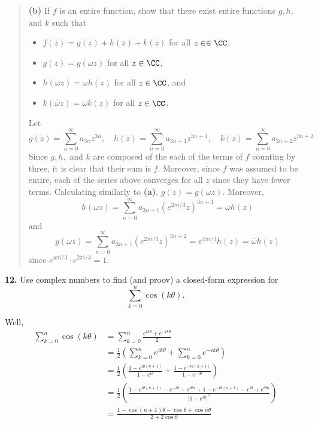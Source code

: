 \documentclass{homework}
\begin{document}
\begin{quote}
  {\bf (b)} If $f$ is an entire function, show that there exist entire functions $g,h$, and $k$ such that
  \begin{itemize}
    \item $f(z) = g(z) + h(z) + k(z)$ for all $z\in \in \CC$,
    \item $g(z) = g(\omega z)$ for all $z\in \CC$,
    \item $h(\omega z) = \omega h(z)$ for all $z\in \CC$, and
    \item $k(\bar \omega z) = \omega k(z)$ for all $z\in \CC$.
  \end{itemize}
  \begin{solution}
    Let 
    $$
      g(z) = \sum_{n=0}^\infty a_{3n}z^{3n},\quad h(z) = \sum_{n=0}^\infty a_{3n+1}z^{3n+1},\quad k(z) = \sum_{n=0}^\infty a_{3n+2}z^{3n+2}
    $$
    Since $g,h,$ and $k$ are composed of the each of the terms of $f$ counting by three, it is clear that their sum is $f$.  Moreover, since $f$ was assumed to be entire, each of the series above converges for all $z$ since they have fewer terms.  Calculating similarly to {\bf (a)}, $g(z) = g(\omega z)$.  Moreover,
    $$
      h(\omega z) = \sum_{n=0}^\infty a_{3n+1}(e^{2\pi i/3} z)^{3n+1} = \omega h(z)
    $$
    and
    $$
      g(\omega z) = \sum_{n=0}^\infty a_{3n+1}(e^{2\pi i/3} z)^{3n+2} = e^{4\pi i/3} h(z) = \bar \omega h(z)
    $$
    since $e^{4\pi i/3} \cdot e^{2\pi i/3} = 1$.
  \end{solution}
\end{quote}

{\bf 12.} Use complex numbers to find (and proov) a closed-form expression for
$$
  \sum_{k=0}^n \cos(k\theta).
$$
\begin{solution}
  Well,
  \begin{align*}
  \sum_{k=0}^n \cos(k\theta) 
  &= \sum_{k=0}^n \frac{e^{ik\theta} + e^{-ik\theta}}{2}\\
  &= \frac 12\left(\sum_{k=0}^n e^{ik\theta} + \sum_{k=0}^ne^{-ik\theta}\right)\\
  &= \frac 12\left(\frac{1-e^{i\theta(n+1)}}{1-e^{i\theta}} + \frac{1-e^{-i\theta(n+1)}}{1-e^{-i\theta}}\right)\\
  &= \frac 12\left(\frac{1-e^{i\theta(n+1)}-e^{-i\theta}+e^{i\theta n} + 1-e^{-i\theta(n+1)}-e^{i\theta} + e^{i\theta n}}{|1-e^{i\theta}|^2}\right)\\
  &= \frac{1-\cos(n+1)\theta-\cos\theta + \cos n \theta}{2+2\cos\theta}\\
  \end{align*}
\end{solution}



\end{document}
